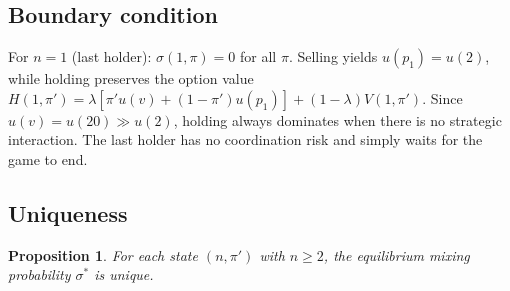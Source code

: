 \documentclass[11pt]{article}
\newtheorem{proposition}{Proposition}
\begin{document}
\subsection{Boundary condition}

For $n = 1$ (last holder): $\sigma(1, \pi) = 0$ for all $\pi$. Selling yields
$u(p_1) = u(2)$, while holding preserves the option value
$H(1,\pi') = \lambda[\pi' u(v) + (1-\pi')u(p_1)] + (1-\lambda)V(1,\pi')$.
Since $u(v) = u(20) \gg u(2)$, holding always dominates when there is no
strategic interaction. The last holder has no coordination risk and
simply waits for the game to end.

\subsection{Uniqueness}

\begin{proposition}
For each state $(n, \pi')$ with $n \geq 2$, the equilibrium mixing probability
$\sigma^*$ is unique.
\end{proposition}
\end{document}
